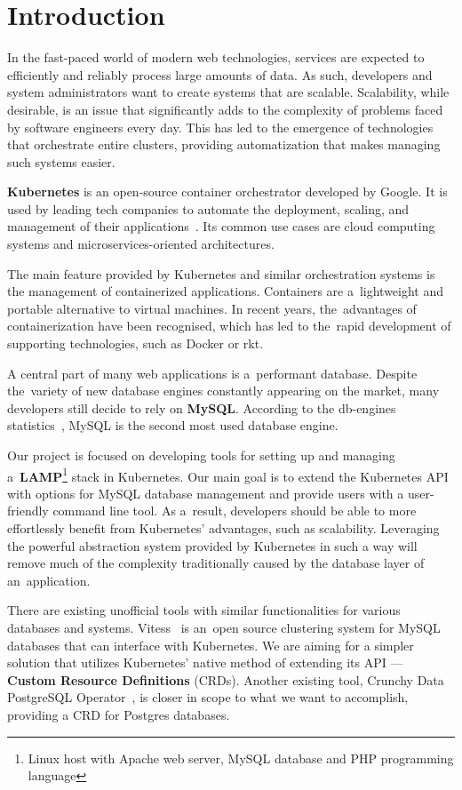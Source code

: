 \chapter{Introduction}
In the fast-paced world of modern web technologies, services are expected to
efficiently and reliably process large amounts of data. As such, developers
and system administrators want to create systems that are scalable. Scalability,
while desirable, is an issue that significantly adds to the complexity of
problems faced by software engineers every day. This has led to the emergence of
technologies that orchestrate entire clusters, providing automatization that
makes managing such systems easier.

\textbf{Kubernetes} is an open-source container orchestrator developed by
Google. It is used by leading tech companies to automate the deployment,
scaling, and management of their applications~\cite{kube-usecase}. Its common
use cases are cloud computing systems and microservices-oriented architectures.

The main feature provided by Kubernetes and similar orchestration
systems is the management of containerized applications. Containers are
a~lightweight and portable alternative to virtual machines. In recent years,
the~advantages of containerization have been recognised, which has led to
the~rapid development of supporting technologies, such as Docker or rkt.

A central part of many web applications is a~performant database. Despite
the~variety of new database engines constantly appearing on the market, many
developers still decide to rely on \textbf{MySQL}. According to the db-engines
statistics~\cite{db-eng}, MySQL is the second most used database
engine.

Our project is focused on developing tools for setting up and managing
a~\textbf{LAMP}\footnote{Linux host with Apache web server, MySQL database
and PHP programming language} stack in Kubernetes. Our main goal is to
extend the Kubernetes API with options for MySQL database
management and provide users with a user-friendly command line tool. As
a~result, developers should be able to more effortlessly benefit from
Kubernetes’ advantages, such as scalability. Leveraging the powerful
abstraction system provided by Kubernetes in such a way will remove
much of the complexity traditionally caused by the database layer of
an~application.

There are existing unofficial tools with similar functionalities for various
databases and systems. Vitess~\cite{vitess} is an~open source
clustering system for MySQL databases that can interface with
Kubernetes. We are aiming for a simpler solution that utilizes
Kubernetes' native method of extending its API ---
\textbf{Custom Resource Definitions} (CRDs). Another existing tool,
Crunchy Data PostgreSQL Operator~\cite{psql-op}, is closer in scope to what we want to
accomplish, providing a CRD for Postgres databases.


